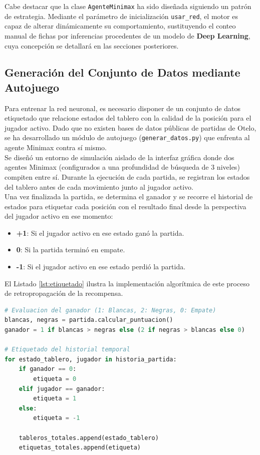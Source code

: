 \documentclass[conference]{IEEEtran}
\begin{document}
Cabe destacar que la clase \texttt{AgenteMinimax} ha sido diseñada siguiendo un patrón de estrategia. Mediante el parámetro de inicialización \texttt{usar\_red}, 
el motor es capaz de alterar dinámicamente su comportamiento, sustituyendo el conteo manual de fichas por inferencias procedentes de un modelo de \textbf{Deep Learning}, cuya 
concepción se detallará en las secciones posteriores.\\

\subsection{Generación del Conjunto de Datos mediante Autojuego}
Para entrenar la red neuronal, es necesario disponer de un conjunto de datos etiquetado que relacione estados del tablero con la calidad de la posición para el jugador activo. 
Dado que no existen bases de datos públicas de partidas de Otelo, se ha desarrollado un módulo de autojuego (\texttt{generar\_datos.py}) que enfrenta al agente Minimax contra sí mismo.\\

Se diseñó un entorno de simulación aislado de la interfaz gráfica donde dos agentes Minimax (configurados a una profundidad de búsqueda de 3 niveles) compiten entre sí. 
Durante la ejecución de cada partida, se registran los estados del tablero antes de cada movimiento junto al jugador activo.\\

Una vez finalizada la partida, se determina el ganador y se recorre el historial de estados para etiquetar cada posición con el resultado final desde la perspectiva del jugador 
activo en ese momento:
\begin{itemize}
    \item \textbf{+1}: Si el jugador activo en ese estado ganó la partida.
    \item \textbf{0}: Si la partida terminó en empate.
    \item \textbf{-1}: Si el jugador activo en ese estado perdió la partida.\\
\end{itemize}

El Listado \ref{lst:etiquetado} ilustra la implementación algorítmica de este proceso de retropropagación de la recompensa.

\begin{lstlisting}[language=Python, caption={Lógica de etiquetado de estados intermedios basándose en el resultado final.}, label={lst:etiquetado}]
# Evaluacion del ganador (1: Blancas, 2: Negras, 0: Empate)
blancas, negras = partida.calcular_puntuacion()
ganador = 1 if blancas > negras else (2 if negras > blancas else 0)

# Etiquetado del historial temporal
for estado_tablero, jugador in historia_partida:
    if ganador == 0:
        etiqueta = 0
    elif jugador == ganador:
        etiqueta = 1
    else:
        etiqueta = -1

    tableros_totales.append(estado_tablero)
    etiquetas_totales.append(etiqueta)
\end{lstlisting}
\end{document}
